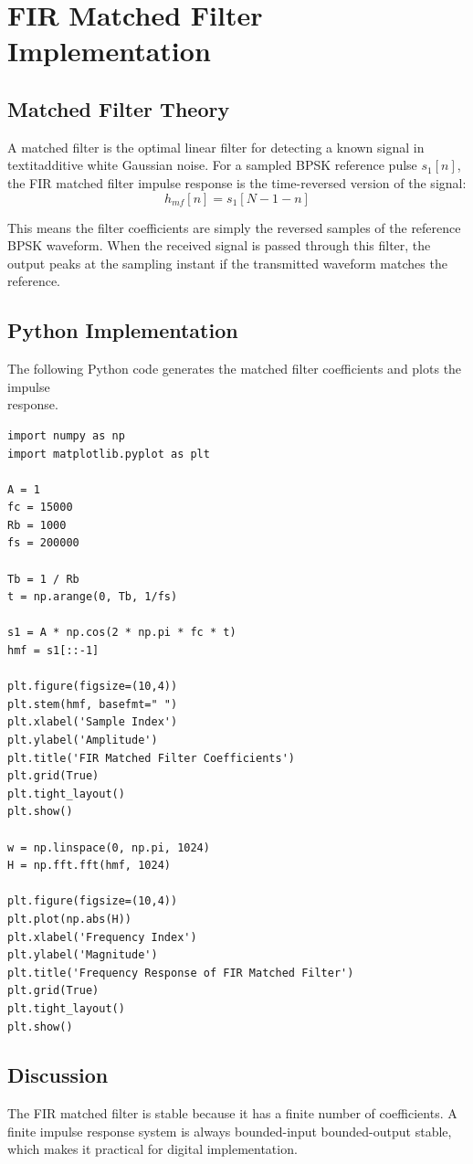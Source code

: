 \chapter{FIR Matched Filter Implementation}

\section{Matched Filter Theory}
A matched filter is the optimal linear filter for detecting a known signal in 
textit{additive white Gaussian noise}. For a sampled BPSK reference pulse \(s_1[n]\), 
the FIR matched filter impulse response is the time-reversed version of the signal:
\[
h_{mf}[n]=s_1[N-1-n]
\]

This means the filter coefficients are simply the reversed samples of the reference BPSK waveform. 
When the received signal is passed through this filter, the output peaks at the sampling instant if the transmitted waveform matches the reference.

\section{Python Implementation}
The following Python code generates the matched filter coefficients and plots the impulse \\response.

\begin{lstlisting}[style=pythonstyle, caption={FIR Matched Filter Coefficients and Frequency \\Response}]
import numpy as np
import matplotlib.pyplot as plt

A = 1
fc = 15000
Rb = 1000
fs = 200000

Tb = 1 / Rb
t = np.arange(0, Tb, 1/fs)

s1 = A * np.cos(2 * np.pi * fc * t)
hmf = s1[::-1]

plt.figure(figsize=(10,4))
plt.stem(hmf, basefmt=" ")
plt.xlabel('Sample Index')
plt.ylabel('Amplitude')
plt.title('FIR Matched Filter Coefficients')
plt.grid(True)
plt.tight_layout()
plt.show()

w = np.linspace(0, np.pi, 1024)
H = np.fft.fft(hmf, 1024)

plt.figure(figsize=(10,4))
plt.plot(np.abs(H))
plt.xlabel('Frequency Index')
plt.ylabel('Magnitude')
plt.title('Frequency Response of FIR Matched Filter')
plt.grid(True)
plt.tight_layout()
plt.show()
\end{lstlisting}

\section{Discussion}
The FIR matched filter is stable because it has a finite number of coefficients. 
A finite impulse response system is always bounded-input bounded-output stable, 
which makes it practical for digital implementation.

